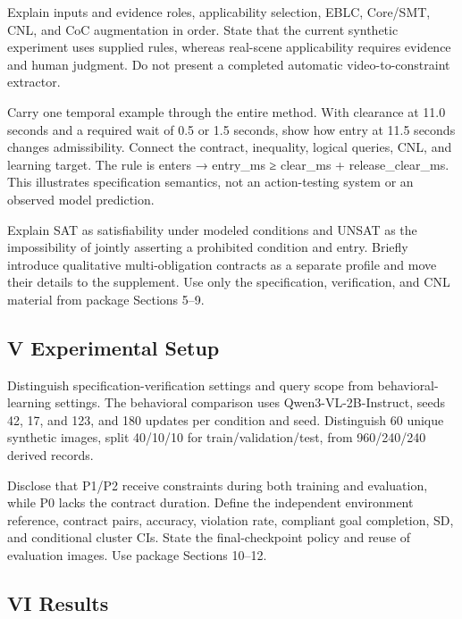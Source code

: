 \documentclass[11pt,a4paper]{article}
\begin{document}
Explain inputs and evidence roles, applicability selection, EBLC, Core/SMT, CNL, and CoC augmentation in order. State that the current synthetic experiment uses supplied rules, whereas real-scene applicability requires evidence and human judgment. Do not present a completed automatic video-to-constraint extractor.\par

Carry one temporal example through the entire method. With clearance at 11.0 seconds and a required wait of 0.5 or 1.5 seconds, show how entry at 11.5 seconds changes admissibility. Connect the contract, inequality, logical queries, CNL, and learning target. The rule is enters → entry\_\allowbreak{}ms ≥ clear\_\allowbreak{}ms + release\_\allowbreak{}clear\_\allowbreak{}ms. This illustrates specification semantics, not an action-testing system or an observed model prediction.\par

Explain SAT as satisfiability under modeled conditions and UNSAT as the impossibility of jointly asserting a prohibited condition and entry. Briefly introduce qualitative multi-obligation contracts as a separate profile and move their details to the supplement. Use only the specification, verification, and CNL material from package Sections 5–9.\par

\subsection*{V Experimental Setup}

Distinguish specification-verification settings and query scope from behavioral-learning settings. The behavioral comparison uses Qwen3-VL-2B-Instruct, seeds 42, 17, and 123, and 180 updates per condition and seed. Distinguish 60 unique synthetic images, split 40/10/10 for train/validation/test, from 960/240/240 derived records.\par

Disclose that P1/P2 receive constraints during both training and evaluation, while P0 lacks the contract duration. Define the independent environment reference, contract pairs, accuracy, violation rate, compliant goal completion, SD, and conditional cluster CIs. State the final-checkpoint policy and reuse of evaluation images. Use package Sections 10–12.\par

\subsection*{VI Results}
\end{document}
